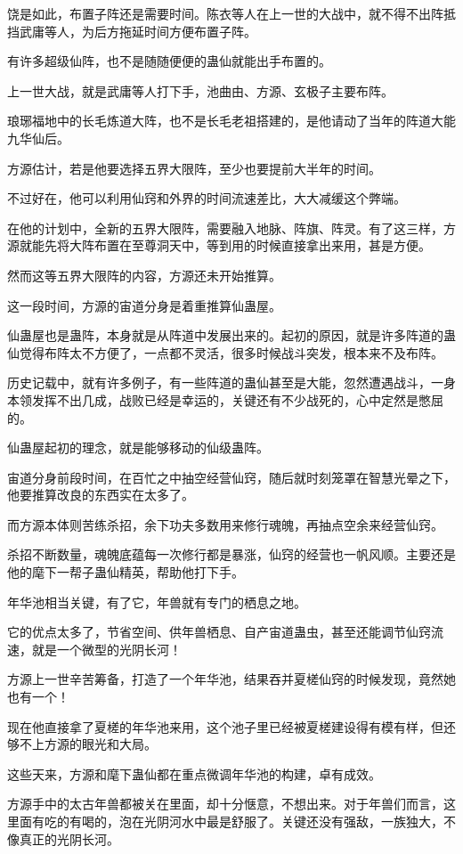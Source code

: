 \begin{this_body}
饶是如此，布置子阵还是需要时间。陈衣等人在上一世的大战中，就不得不出阵抵挡武庸等人，为后方拖延时间方便布置子阵。

有许多超级仙阵，也不是随随便便的蛊仙就能出手布置的。

上一世大战，就是武庸等人打下手，池曲由、方源、玄极子主要布阵。

琅琊福地中的长毛炼道大阵，也不是长毛老祖搭建的，是他请动了当年的阵道大能九华仙后。

方源估计，若是他要选择五界大限阵，至少也要提前大半年的时间。

不过好在，他可以利用仙窍和外界的时间流速差比，大大减缓这个弊端。

在他的计划中，全新的五界大限阵，需要融入地脉、阵旗、阵灵。有了这三样，方源就能先将大阵布置在至尊洞天中，等到用的时候直接拿出来用，甚是方便。

然而这等五界大限阵的内容，方源还未开始推算。

这一段时间，方源的宙道分身是着重推算仙蛊屋。

仙蛊屋也是蛊阵，本身就是从阵道中发展出来的。起初的原因，就是许多阵道的蛊仙觉得布阵太不方便了，一点都不灵活，很多时候战斗突发，根本来不及布阵。

历史记载中，就有许多例子，有一些阵道的蛊仙甚至是大能，忽然遭遇战斗，一身本领发挥不出几成，战败已经是幸运的，关键还有不少战死的，心中定然是憋屈的。

仙蛊屋起初的理念，就是能够移动的仙级蛊阵。

宙道分身前段时间，在百忙之中抽空经营仙窍，随后就时刻笼罩在智慧光晕之下，他要推算改良的东西实在太多了。

而方源本体则苦练杀招，余下功夫多数用来修行魂魄，再抽点空余来经营仙窍。

杀招不断数量，魂魄底蕴每一次修行都是暴涨，仙窍的经营也一帆风顺。主要还是他的麾下一帮子蛊仙精英，帮助他打下手。

年华池相当关键，有了它，年兽就有专门的栖息之地。

它的优点太多了，节省空间、供年兽栖息、自产宙道蛊虫，甚至还能调节仙窍流速，就是一个微型的光阴长河！

方源上一世辛苦筹备，打造了一个年华池，结果吞并夏槎仙窍的时候发现，竟然她也有一个！

现在他直接拿了夏槎的年华池来用，这个池子里已经被夏槎建设得有模有样，但还够不上方源的眼光和大局。

这些天来，方源和麾下蛊仙都在重点微调年华池的构建，卓有成效。

方源手中的太古年兽都被关在里面，却十分惬意，不想出来。对于年兽们而言，这里面有吃的有喝的，泡在光阴河水中最是舒服了。关键还没有强敌，一族独大，不像真正的光阴长河。


\end{this_body}
